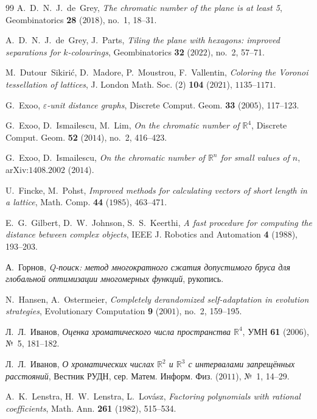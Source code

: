 \documentclass[11pt]{article}
\theoremstyle{definition}
\theoremstyle{remark}
\newcommand{\R}{\mathbb{R}}
\begin{document}
\begin{thebibliography}{99}
 A.~D.~N.~J.~de~Grey,
\emph{The chromatic number of the plane is at least 5},
Geombinatorics \textbf{28} ($2018$), no.~1, 18--31.

 A.~D.~N.~J.~de~Grey, J.~Parts,
\emph{Tiling the plane with hexagons: improved separations for
$k$-colourings},
Geombinatorics \textbf{32} ($2022$), no.~2, 57--71.

 M.~Dutour~Sikiri\'c, D.~Madore, P.~Moustrou, F.~Vallentin,
\emph{Coloring the Voronoi tessellation of lattices},
J. London Math. Soc. (2) \textbf{104} ($2021$), $1135$--$1171$.

 G.~Exoo,
\emph{$\varepsilon$-unit distance graphs},
Discrete Comput. Geom. \textbf{33} ($2005$), 117--123.

 G.~Exoo, D.~Ismailescu, M.~Lim,
\emph{On the chromatic number of $\R^4$},
Discrete Comput. Geom. \textbf{52} ($2014$), no.~2, 416--423.

 G.~Exoo, D.~Ismailescu,
\emph{On the chromatic number of $\R^n$ for small values of $n$},
arXiv:$1408$.$2002$ ($2014$).

 U.~Fincke, M.~Pohst,
\emph{Improved methods for calculating vectors of short length in a lattice},
Math. Comp. \textbf{44} ($1985$), 463--471.

 E.~G.~Gilbert, D.~W.~Johnson, S.~S.~Keerthi,
\emph{A fast procedure for computing the distance between complex objects},
IEEE J. Robotics and Automation \textbf{4} ($1988$), 193--203.

 А.~Горнов,
\emph{Q-поиск: метод многократного сжатия допустимого бруса для глобальной
оптимизации многомерных функций}, рукопись.

 N.~Hansen, A.~Ostermeier,
\emph{Completely derandomized self-adaptation in evolution strategies},
Evolutionary Computation \textbf{9} ($2001$), no.~2, 159--195.

 Л.~Л.~Иванов,
\emph{Оценка хроматического числа пространства $\R^4$},
УМН \textbf{61} ($2006$), №~5, 181--182.

 Л.~Л.~Иванов,
\emph{О хроматических числах $\R^2$ и $\R^3$ с интервалами запрещённых
расстояний}, Вестник РУДН, сер. Матем. Информ. Физ. ($2011$), №~1, 14--29.

 A.~K.~Lenstra, H.~W.~Lenstra, L.~Lov\'asz,
\emph{Factoring polynomials with rational coefficients},
Math. Ann. \textbf{261} ($1982$), 515--534.


\end{thebibliography}
\end{document}
